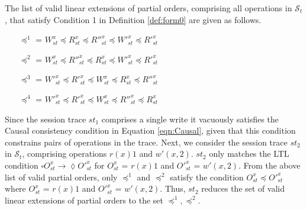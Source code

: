 \documentclass[journal,compsoc]{IEEEtran}
\begin{document}
 The list of valid linear extensions of partial orders, comprising all operations in $\mathcal{S}_t$, that satisfy Condition 1 in Definition \ref{def:form0} are given as follows.
 \begin{itemize}
 \item [$\preccurlyeq^1$ =] $W^x_{\mathit{st}}   \preccurlyeq R^x_{\mathit{st}}  \preccurlyeq R''^x_{\mathit{st}}  \preccurlyeq W'^x_{\mathit{st}}   \preccurlyeq R'^x_{\mathit{st}} $
 \item [$\preccurlyeq^2$ =] $ W^x_{\mathit{st}}   \preccurlyeq R''^x_{\mathit{st}}  \preccurlyeq R^x_{\mathit{st}}   \preccurlyeq W'^x_{\mathit{st}}  \preccurlyeq R'^x_{\mathit{st}}$
 \item [$\preccurlyeq^3$ =] $   W'^x_{\mathit{st}}  \preccurlyeq R'^x_{\mathit{st}} \preccurlyeq  W^x_{\mathit{st}}  \preccurlyeq R^x_{\mathit{st}} \preccurlyeq R''^x_{\mathit{st}}$
 \item [$\preccurlyeq^4$ =] $  W'^x_{\mathit{st}}  \preccurlyeq R'^x_{\mathit{st}} \preccurlyeq W^x_{\mathit{st}}  \preccurlyeq R''^x_{\mathit{st}} \preccurlyeq R^x_{\mathit{st}}  $
 \end{itemize} %
 Since the session trace  $\mathit{st}_1$ comprises a single write it vacuously satisfies the Causal consistency condition  in Equation \ref{eqn:Causal}, given that this condition constrains pairs of operations in the trace.
   Next, we consider the  session trace $\mathit{st}_2$ in $\mathcal{S}_t$, comprising operations $r(x){1}$ and $w'(x,2)$. $\mathit{st}_2$ only matches the LTL condition $ \square {\mathit{O}}^x_{\mathit{st}} \rightarrow \lozenge {\mathit{O}}'^x_{\mathit{st}}$ for ${\mathit{O}}^x_{\mathit{st}}$ = $r(x){1}$ and  ${\mathit{O}}'^x_{\mathit{st}}$ = $w'(x,2)$.  From the above list of valid partial orders, only $\preccurlyeq^1$ and $\preccurlyeq^2$ satisfy the  condition ${\mathit{O}}^x_{\mathit{st}} \preccurlyeq {\mathit{O}}'^x_{\mathit{st}}$ where ${\mathit{O}}^x_{\mathit{st}}$ = $r(x){1}$ and  ${\mathit{O}}'^x_{\mathit{st}}$ = $w'(x,2)$. Thus, $\mathit{st}_2$ reduces the set of valid linear extensions of partial orders to the set $\preccurlyeq^1, \preccurlyeq^2$.
\end{document}
